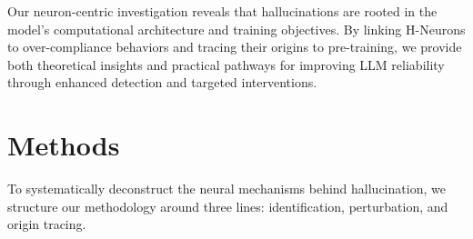 \documentclass[dvipsnames]{article}
\begin{document}
Our neuron-centric investigation reveals that hallucinations are rooted in the model's computational architecture and training objectives. By linking H-Neurons to over-compliance behaviors and tracing their origins to pre-training, we provide both theoretical insights and practical pathways for improving LLM reliability through enhanced detection and targeted interventions.







\section{Methods}\label{Methods}
To systematically deconstruct the neural mechanisms behind hallucination, we structure our methodology around three lines: identification, perturbation, and origin tracing.
\end{document}
